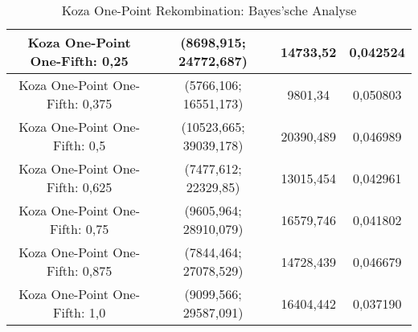 \begin{table}[H]
\begin{tabular}{c | c | c | c}
		Koza One-Point One-Fifth: 0,25 & (8698,915; 24772,687) & 14733,52 & 0,042524\\
		\hline
		Koza One-Point One-Fifth: 0,375 & (5766,106; 16551,173) & 9801,34 & 0,050803 \\
		\hline
		Koza One-Point One-Fifth: 0,5 & (10523,665; 39039,178) & 20390,489 & 0,046989\\
		\hline
		Koza One-Point One-Fifth: 0,625 & (7477,612; 22329,85) & 13015,454 & 0,042961\\
		\hline
		Koza One-Point One-Fifth: 0,75 & (9605,964; 28910,079) & 16579,746 & 0,041802\\
		\hline
		Koza One-Point One-Fifth: 0,875 & (7844,464; 27078,529) & 14728,439 & 0,046679\\
		\hline
		Koza One-Point One-Fifth: 1,0 & (9099,566; 29587,091) & 16404,442 & 0,037190\\
	\end{tabular}
	\label{table:kozaOnePointBayesian}
	\caption{Koza One-Point Rekombination: Bayes'sche Analyse}
\end{table}

